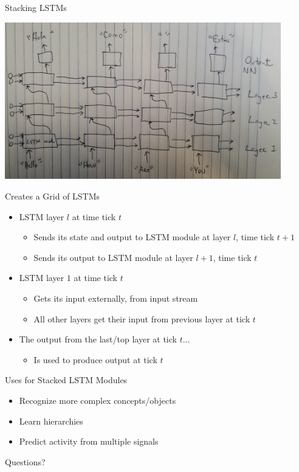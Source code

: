 \documentclass[aspectratio=169]{beamer}
\begin{document}
\begin{frame}{Stacking LSTMs}

\includegraphics[width=0.9\textwidth]{lectLSTM/Stacked.jpg}
\end{frame}
\begin{frame}{Creates a Grid of LSTMs}
\begin{itemize}
	\item LSTM layer $l$ at time tick $t$
	\begin{itemize}
		\item Sends its state and output to LSTM module at layer $l$, time tick $t + 1$
		\item Sends its output to LSTM module at layer $l + 1$, time tick $t$
	\end{itemize}
	\item LSTM layer $1$ at time tick $t$
	\begin{itemize}
		\item Gets its input externally, from input stream
		\item All other layers get their input from previous layer at tick $t$
	\end{itemize}
	\item The output from the last/top layer at tick $t$...
	\begin{itemize}
		\item Is used to produce output at tick $t$
	\end{itemize}
\end{itemize}
\end{frame}
\begin{frame}{Uses for Stacked LSTM Modules}

\begin{itemize}
	\item Recognize more complex concepts/objects %
	\item Learn hierarchies
	\item Predict activity from multiple signals
\end{itemize}
\end{frame}

\begin{frame}{Questions?}
\end{frame}
\end{document}
